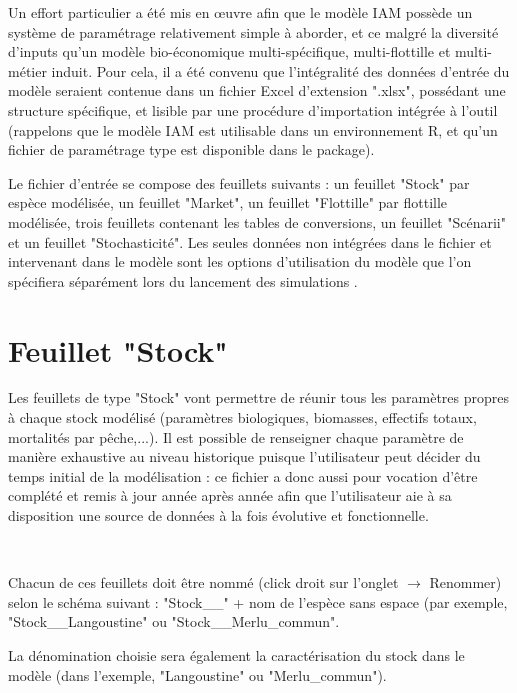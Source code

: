 \documentclass[12pt, colorinlistoftodos, notitlepage]{report}
\newenvironment{not used}[1]{%
    \longtable{%
        |>{\centering$\displaystyle}A{#1}{1}<{$}%
        |}\hline\ignorespaces}{%
    \endlongtable\ignorespacesafterend}
\newcommand\Warning{%
 \makebox[1.4em][c]{%
 \makebox[0pt][c]{\raisebox{.1em}{\small!}}%
 \makebox[0pt][c]{\color{red}\Large$\bigtriangleup$}}}%
\begin{document}
Un effort particulier a été mis en œuvre afin que le modèle IAM possède un système de paramétrage relativement simple à aborder, et ce malgré la diversité d'inputs qu'un modèle bio-économique multi-spécifique, multi-flottille et multi-métier induit. Pour cela, il a été convenu que l'intégralité des données d'entrée du modèle seraient contenue dans un fichier Excel d'extension ".xlsx", possédant une structure spécifique, et lisible par une procédure d'importation intégrée à l'outil (rappelons que le modèle IAM est utilisable dans un environnement R, et qu'un fichier de paramétrage type est disponible dans le package).
	
Le fichier d'entrée se compose des feuillets suivants : un feuillet "Stock" par espèce modélisée, un feuillet "Market", un feuillet "Flottille" par flottille modélisée, trois feuillets contenant les tables de conversions, un feuillet "Scénarii" et un feuillet "Stochasticité". Les seules données non intégrées dans le fichier et intervenant dans le modèle sont les options d'utilisation du modèle que l'on spécifiera séparément lors du lancement des simulations .	

\section{Feuillet "Stock"} \label{sec:stock}

Les feuillets de type "Stock" vont permettre de réunir tous les paramètres propres à chaque stock modélisé (paramètres biologiques, biomasses, effectifs totaux, mortalités par pêche,...). Il est possible de renseigner chaque paramètre de manière exhaustive au niveau historique puisque l'utilisateur peut décider du temps initial de la modélisation : ce fichier a donc aussi pour vocation d'être complété et remis à jour année après année afin que l'utilisateur aie à sa disposition une source de données à la fois évolutive et fonctionnelle.

\par~\par

Chacun de ces feuillets doit être nommé (click droit sur l'onglet $ \to $ Renommer) selon le schéma suivant : "Stock\_\_" + nom de l'espèce sans espace (par exemple, "Stock\_\_Langoustine" ou "Stock\_\_Merlu\_commun".

\Warning La dénomination choisie sera également la caractérisation du stock dans le modèle (dans l'exemple, "Langoustine" ou "Merlu\_commun").

\par~\par
\end{document}
